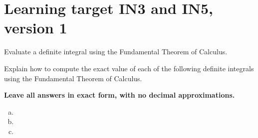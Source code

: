 \pagebreak
\fi
\section{Learning target IN3 and IN5, version 1} %

Evaluate a definite integral using the Fundamental Theorem of Calculus.

\hrulefill


Explain how to compute the exact value of each of the following definite integrals using the Fundamental Theorem of Calculus. 

\textbf{Leave all answers in exact form, with no decimal approximations. }

\begin{enumerate}[(a)]
\item
{}

\item
{}

\item
{}

\end{enumerate}


